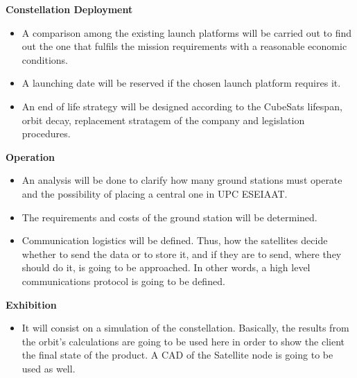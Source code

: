 {\bfseries Constellation Deployment} 

\begin{itemize}
	\item A comparison among the existing launch platforms will be carried out to find out the
one that fulfils the mission requirements with a reasonable economic conditions.
	\item A launching date will be reserved if the chosen launch platform requires it.
 	\item An end of life strategy will be designed according to the CubeSats lifespan, orbit decay,
replacement stratagem of the company and legislation procedures.
\end{itemize}

{\bfseries Operation} 

\begin{itemize}
	\item An analysis will be done to clarify how many ground stations must operate and the possibility of placing a central one in UPC ESEIAAT.
	\item The requirements and costs of the ground station will be determined. 
	\item Communication logistics will be defined. Thus, how the satellites decide whether to send the data or to store it, and if they are to send, where they should do it, is going to be approached. In other words, a high level communications protocol is going to be defined. 
\end{itemize}

{\bfseries Exhibition}

\begin{itemize}
	\item It will consist on a simulation of the constellation. Basically, the results from the orbit's calculations are going to be used here in order to show the client the final state of the product. A CAD of the Satellite node is going to be used as well.

\end{itemize}